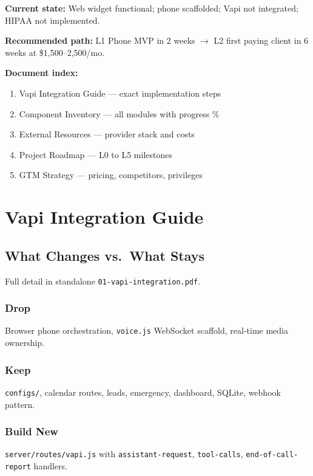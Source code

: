 \documentclass[11pt,a4paper]{report}
\begin{document}
\textbf{Current state:} Web widget functional; phone scaffolded; Vapi not integrated; HIPAA not implemented.

\textbf{Recommended path:} L1 Phone MVP in 2 weeks $\rightarrow$ L2 first paying client in 6 weeks at \$1,500--2,500/mo.

\textbf{Document index:}
\begin{enumerate}
  \item Vapi Integration Guide --- exact implementation steps
  \item Component Inventory --- all modules with progress \%
  \item External Resources --- provider stack and costs
  \item Project Roadmap --- L0 to L5 milestones
  \item GTM Strategy --- pricing, competitors, privileges
\end{enumerate}

\chapter{Vapi Integration Guide}

\section{What Changes vs.\ What Stays}
Full detail in standalone \texttt{01-vapi-integration.pdf}.

\subsection{Drop}
Browser phone orchestration, \texttt{voice.js} WebSocket scaffold, real-time media ownership.

\subsection{Keep}
\texttt{configs/}, calendar routes, leads, emergency, dashboard, SQLite, webhook pattern.

\subsection{Build New}
\texttt{server/routes/vapi.js} with \texttt{assistant-request}, \texttt{tool-calls}, \texttt{end-of-call-report} handlers.
\end{document}
